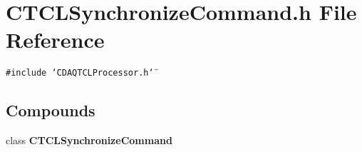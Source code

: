 \section{CTCLSynchronize\-Command.h File Reference}
\label{CTCLSynchronizeCommand_8h}
{\tt \#include \char`\"{}CDAQTCLProcessor.h\char`\"{}}\par
\subsection*{Compounds}
\begin{CompactItemize}
\item 
class {\bf CTCLSynchronize\-Command}
\end{CompactItemize}
